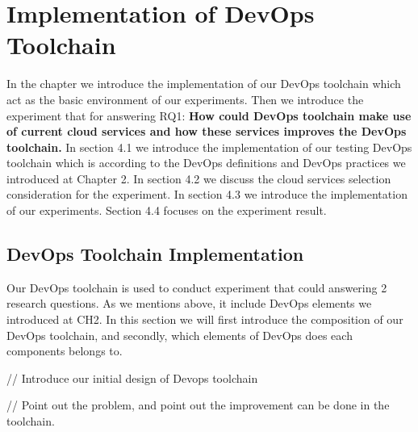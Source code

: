 \chapter{Implementation of DevOps Toolchain}
In the chapter we introduce the implementation of our DevOps toolchain which act as the basic environment of our experiments. Then we introduce the experiment that for answering RQ1: \textbf{How could DevOps toolchain make use of current cloud services and how these services improves the DevOps toolchain.} In section 4.1 we introduce the implementation of our testing DevOps toolchain which is according to the DevOps definitions and DevOps practices we introduced at Chapter 2. In section 4.2 we discuss the cloud services selection consideration for the experiment. In section 4.3 we introduce the implementation of our experiments. Section 4.4 focuses on the experiment result.
\section{DevOps Toolchain Implementation}
Our DevOps toolchain is used to conduct experiment that could answering 2 research questions. As we mentions above, it include DevOps elements we introduced at CH2. In this section we will first introduce the composition of our DevOps toolchain, and secondly, which elements of DevOps does each components belongs to.

// Introduce our initial design of Devops toolchain

// Point out the problem, and point out the improvement can be done in the toolchain.


